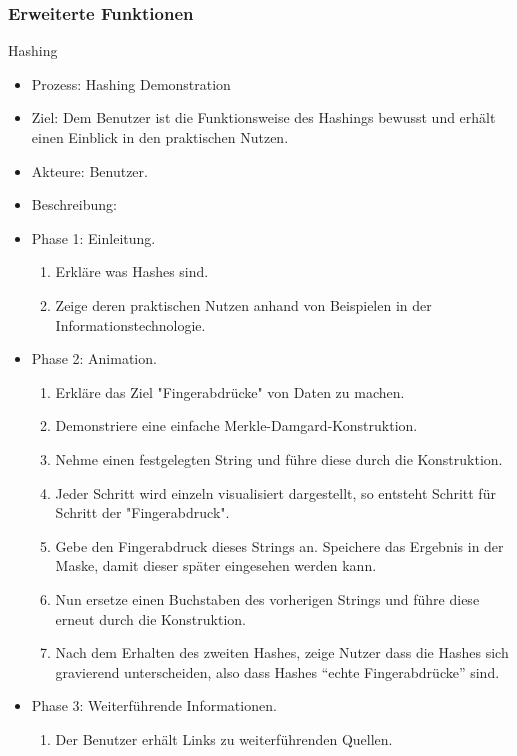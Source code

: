 \documentclass{article}
\begin{document}
\subsubsection{Erweiterte Funktionen}

\begin{FA}[start=600]
\item Hashing
\end{FA}
\begin{itemize}[label={}]
\item Prozess: Hashing Demonstration
\item Ziel: Dem Benutzer ist die Funktionsweise des Hashings bewusst und erhält einen Einblick in den praktischen Nutzen.
\item Akteure: Benutzer.
\item Beschreibung:
\item Phase 1: Einleitung.
\begin{enumerate}
\item Erkläre was Hashes sind.
\item Zeige deren praktischen Nutzen anhand von Beispielen in der Informationstechnologie.
\end{enumerate}
\item Phase 2: Animation.
\begin{enumerate}
\item Erkläre das Ziel "Fingerabdrücke" von Daten zu machen.
\item Demonstriere eine einfache Merkle-Damgard-Konstruktion.
\item Nehme einen festgelegten String und führe diese durch die Konstruktion.
\item Jeder Schritt wird einzeln visualisiert dargestellt, so entsteht Schritt für Schritt der "Fingerabdruck".
\item Gebe den Fingerabdruck dieses Strings an. Speichere das Ergebnis in der Maske, damit dieser später eingesehen werden kann.
\item Nun ersetze einen Buchstaben des vorherigen Strings und führe diese erneut durch die Konstruktion.
\item Nach dem Erhalten des zweiten Hashes, zeige Nutzer dass die Hashes sich gravierend unterscheiden, also dass Hashes ``echte Fingerabdrücke'' sind.
\end{enumerate}
\item Phase 3: Weiterführende Informationen.
\begin{enumerate}
\item Der Benutzer erhält Links zu weiterführenden Quellen.
\end{enumerate}
\end{itemize}
\end{document}
